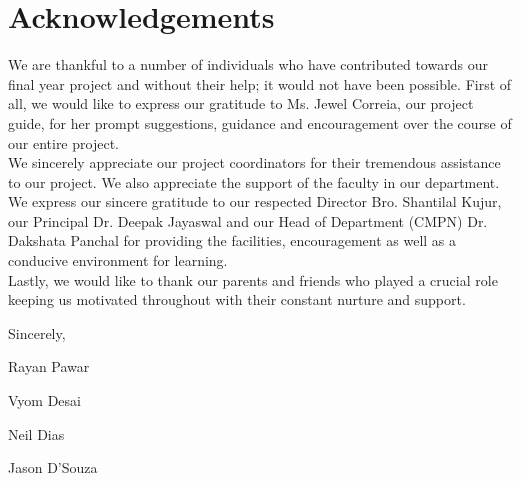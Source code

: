 \chapter*{Acknowledgements}
\pagestyle{fancy}
\fancyhf{}
\renewcommand{\headrulewidth}{0pt}
\rhead{}
\cfoot{\thepage}
\onehalfspacing
\large {
\noindent
We are thankful to a number of individuals who have contributed towards our final year project and without their help; it would not have been possible. First of all, we would like to express our gratitude to Ms. Jewel Correia, our project guide, for her prompt suggestions, guidance and encouragement over the course of our entire project.\\

\noindent
We sincerely appreciate our project coordinators for their tremendous assistance to our project. We also appreciate the support of the faculty in our department.\\

\noindent
We express our sincere gratitude to our respected Director Bro. Shantilal Kujur, our Principal Dr. Deepak Jayaswal and our Head of Department (CMPN) Dr. Dakshata Panchal for providing the facilities, encouragement as well as a conducive environment for learning.\\

\noindent
Lastly, we would like to thank our parents and friends who played a crucial role keeping us motivated throughout with their constant nurture and support.}

\vspace{0.75cm}
\hspace{110.00mm}Sincerely,

\vspace{0.75cm}
\hspace{110.00mm}Rayan Pawar

\vspace{0.2cm}
\hspace{110.00mm}Vyom Desai

\vspace{0.2cm}
\hspace{110.00mm}Neil Dias

\vspace{0.2cm}
\hspace{110.00mm}Jason D'Souza
